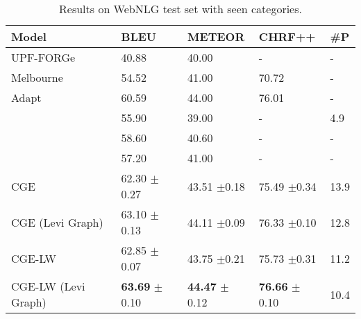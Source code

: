 \documentclass[11pt,a4paper]{article}
\begin{document}
\begin{table*}[t]
\centering
{\renewcommand{\arraystretch}{0.8}
\begin{tabular}{lllll}  
\toprule
\textbf{Model} & \textbf{BLEU} & \textbf{METEOR} & \textbf{CHRF++} &  \textbf{\#P}  \\
\midrule
 UPF-FORGe \cite{gardent-etal-2017-webnlg}   & 40.88 & 40.00 & -  & - \\
 Melbourne \cite{gardent-etal-2017-webnlg}  & 54.52 & 41.00 & 70.72 & -  \\
 Adapt \cite{gardent-etal-2017-webnlg}  & 60.59 & 44.00 & 76.01 & - \\
 \citet{marcheggiani-icnl18}   & 55.90 & 39.00 & - & 4.9 \\
  \citet{trisedya-etal-2018-gtr}   & 58.60 & 40.60 & - & - \\
 \citet{castro-ferreira-etal-2019-neural}  & 57.20 & 41.00 & -  & -\\
\midrule
 CGE & 62.30 {\small $\pm$0.27} & 43.51 {\small $\pm$0.18} & 75.49 {\small $\pm$0.34}  & 13.9 \\
 CGE (Levi Graph)  & 63.10 {\small $\pm$0.13} & 44.11 {\small $\pm$0.09} & 76.33 {\small $\pm$0.10}  & 12.8 \\
  CGE-LW & 62.85 {\small $\pm$0.07} & 43.75 {\small $\pm$0.21} & 75.73 {\small $\pm$0.31}  & 11.2 \\
 CGE-LW (Levi Graph)  & \textbf{63.69} {\small $\pm$0.10} & \textbf{44.47} {\small $\pm$0.12} & \textbf{76.66} {\small $\pm$0.10}  & 10.4 \\
\bottomrule
\end{tabular}}
\caption{Results on WebNLG test set with seen categories.}
\label{tab:webnlg_results}
\end{table*}
\end{document}
